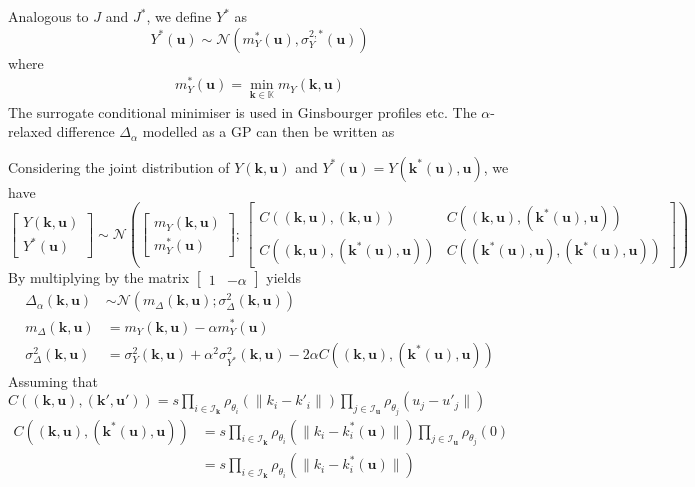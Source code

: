 \documentclass[a4paper,11pt]{article}
\newcommand{\Kspace}{\mathbb{K}}
\begin{document}
Analogous to $J$ and $J^*$, we define $Y^*$ as
\begin{equation}
  Y^*(\mathbf{u}) \sim \mathcal{N}\left(m^*_Y(\mathbf{u}), \sigma^{2,*}_Y(\mathbf{u})\right)
\end{equation}
where
\begin{align}
  m^*_Y(\mathbf{u}) = \min_{\mathbf{k}\in\Kspace} m_Y(\mathbf{k},\mathbf{u})
\end{align}
The surrogate conditional minimiser is used in Ginsbourger profiles etc.
The $\alpha$-relaxed difference  $\Delta_{\alpha}$ modelled as a GP can then be written as

Considering the joint distribution of $Y(\mathbf{k},\mathbf{u})$ and $Y^*(\mathbf{u}) = Y(\mathbf{k}^*(\mathbf{u}), \mathbf{u})$, we have
\begin{equation}
  \begin{bmatrix}
    Y(\mathbf{k},\mathbf{u}) \\
    Y^*(\mathbf{u})
  \end{bmatrix}
  \sim \mathcal{N}\left(
    \begin{bmatrix}
      m_Y(\mathbf{k},\mathbf{u}) \\
      m_Y^*(\mathbf{u})
    \end{bmatrix}
    ;\,
    \begin{bmatrix}
      C\left((\mathbf{k},\mathbf{u}),(\mathbf{k},\mathbf{u})\right) & C\left((\mathbf{k},\mathbf{u}),(\mathbf{k}^*(\mathbf{u}),\mathbf{u})\right) \\
      C\left((\mathbf{k},\mathbf{u}),(\mathbf{k}^*(\mathbf{u}),\mathbf{u})\right) & C\left((\mathbf{k}^*(\mathbf{u}),\mathbf{u}),(\mathbf{k}^*(\mathbf{u}),\mathbf{u})\right)
    \end{bmatrix}
\right)
\end{equation}
By multiplying by the matrix $\begin{bmatrix}1 & -\alpha \end{bmatrix}$ yields
\begin{align}
  \Delta_{\alpha}(\mathbf{k},\mathbf{u}) &\sim \mathcal{N}\left(m_{\Delta}(\mathbf{k},\mathbf{u}); \sigma^2_{\Delta}(\mathbf{k},\mathbf{u})\right) \\
  m_{\Delta}(\mathbf{k},\mathbf{u}) &= m_Y(\mathbf{k},\mathbf{u}) - \alpha m_Y^*(\mathbf{u}) \\
  \sigma^2_{\Delta}(\mathbf{k},\mathbf{u}) &= \sigma_Y^2(\mathbf{k},\mathbf{u}) + \alpha^2 \sigma_{Y^*}^2(\mathbf{k},\mathbf{u}) - 2\alpha C\left((\mathbf{k},\mathbf{u}),(\mathbf{k}^*(\mathbf{u}),\mathbf{u})\right)
\end{align}
Assuming that $C((\mathbf{k},\mathbf{u}), (\mathbf{k}',\mathbf{u}')) = s \prod_{i\in\mathcal{I}_{\mathbf{k}}}\rho_{\theta_i}(\|k_i - k'_i\|) \prod_{j\in\mathcal{I}_{\mathbf{u}}} \rho_{\theta_j}(u_j - u'_j\|)$
\begin{align}
  C\left((\mathbf{k},\mathbf{u}),(\mathbf{k}^*(\mathbf{u}),\mathbf{u})\right) &= s \prod_{i\in\mathcal{I}_{\mathbf{k}}}\rho_{\theta_i}(\|k_i - k^*_i(\mathbf{u})\|)\prod_{j\in\mathcal{I}_{\mathbf{u}}} \rho_{\theta_j}(0) \\
  &=s \prod_{i\in\mathcal{I}_{\mathbf{k}}}\rho_{\theta_i}(\|k_i - k^*_i(\mathbf{u})\|)
\end{align}
\end{document}
